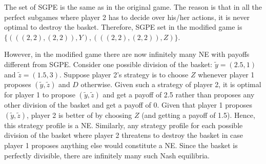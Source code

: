 \documentclass[]{article}
\begin{document}
The set of SGPE is the same as in the original game. The reason is that in all the perfect subgames where player 2 has to decide over his/her actions, it is never optimal to destroy the basket. Therefore, SGPE set in the modified game is $\{(((2, 2), (2, 2)), Y), (((2, 2), (2, 2)), Z)\}$.

However, in the modified game there are now infinitely many NE with payoffs different from SGPE. Consider one possible division of the basket: $\tilde{y} = (2.5, 1)$ and $\tilde{z} = (1.5, 3)$. Suppose player 2's strategy is to choose $Z$ whenever player 1 proposes $(\tilde{y}, \tilde{z})$ and $D$ otherwise. Given such a strategy of player 2, it is optimal for player 1 to propose $(\tilde{y}, \tilde{z})$ and get a payoff of 2.5 rather than proposes any other division of the basket and get a payoff of 0. Given that player 1 proposes $(\tilde{y}, \tilde{z})$, player 2 is better of by choosing $Z$ (and getting a payoff of 1.5). Hence, this strategy profile is a NE. Similarly, any strategy profile for each possible division of the basket where player 2 threatens to destroy the basket in case player 1 proposes anything else would constitute a NE. Since the basket is perfectly divisible, there are infinitely many such Nash equilibria.
\end{document}
